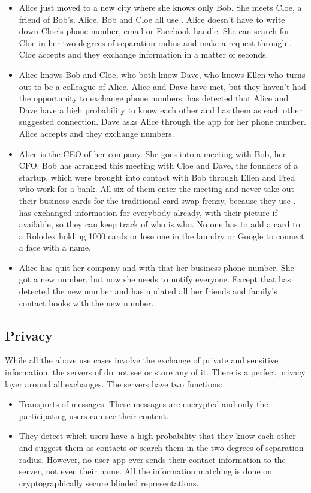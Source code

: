 \documentclass[a4paper, 10pt]{article}
\begin{document}
\begin{itemize}
  \item Alice just moved to a new city where she knows only Bob. She meets Cloe, a friend of Bob's. Alice, Bob and Cloe all use \commercialName{}. Alice doesn't have to write 
down Cloe's phone number, email or Facebook handle. She can search for Cloe in her two-degrees of separation radius and make a request through \commercialName{}. Cloe accepts and 
they exchange information in a matter of seconds.
  \item Alice knows Bob and Cloe, who both know Dave, who knows Ellen who turns out to be a colleague of Alice. Alice and Dave have met, but they haven't had the opportunity to 
exchange phone numbers. \commercialName{} has detected that Alice and Dave have a high probability to know each other and has them as each other suggested connection. Dave asks 
Alice through the app for her phone number. Alice accepts and they exchange numbers.
  \item Alice is the CEO of her company. She goes into a meeting with Bob, her CFO. Bob has arranged this meeting with Cloe and Dave, the founders of a startup, which were brought 
into contact with Bob through Ellen and Fred who work for a bank. All six of them enter the meeting and never take out their business cards for the traditional card swap frenzy, 
because they use \commercialName{}. \commercialName{} has exchanged information for everybody already, with their picture if available, so they can keep track of who is who. No 
one has to add a card to a Rolodex holding 1000 cards or lose one in the laundry or Google to connect a face with a name.
  \item Alice has quit her company and with that her business phone number. She got a new number, but now she needs to notify everyone. Except that \commercialName{} has detected 
the new number and has updated all her friends and family's contact books with the new number.
\end{itemize}

\subsection{Privacy}

While all the above use cases involve the exchange of private and sensitive information, the servers of \commercialName{} do not see or store any of it. There is a perfect privacy 
layer around all exchanges. The servers have two functions:

\begin{itemize}
 \item Transports of messages. These messages are encrypted and only the participating users can see their content.
 \item They detect which users have a high probability that they know each other and suggest them as contacts or search them in the two degrees of separation radius. However, no 
user app ever sends their contact information to the server, not even their name. All the information matching is done on cryptographically secure blinded representations.
\end{itemize}
\end{document}
